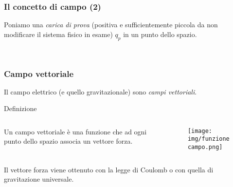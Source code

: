 \documentclass[handout]{beamer}
\theoremstyle{plain}
\begin{document}
\begin{frame}
\frametitle{Il concetto di campo (2)}

\begin{figure}
\end{figure}
Poniamo una \emph<1>{carica di prova} (positiva e sufficientemente piccola da non modificare il sistema fisico in esame) $ q_p $ in un punto dello spazio.

~

\end{frame}



\begin{frame}
\frametitle{Campo vettoriale}
Il campo elettrico (e quello gravitazionale) sono \emph{campi vettoriali}.

\begin{block}{Definizione}
\begin{columns}
\begin{column}{0.4\textwidth}
Un campo vettoriale è una funzione che ad ogni punto dello spazio associa un vettore forza.
\end{column}
\begin{column}{0.4\textwidth}
\begin{figure}
\texttt{[image: img/funzionecampo.png]}
\end{figure}
\end{column}
\end{columns}
\end{block}

Il vettore forza viene ottenuto con la legge di Coulomb o con quella di gravitazione universale.
\end{frame}
\end{document}
